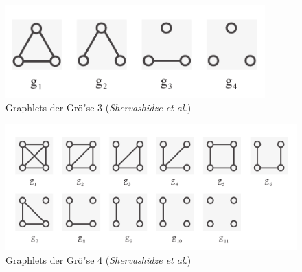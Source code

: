 \documentclass{report}
\begin{document}
\begin{center}


\begin{figure}[H]
\includegraphics[width =100mm]{3graphlets.pdf}
\caption{Graphlets der Gr\"o"se 3 (\textit{Shervashidze et al.})}
\label{fig:3graphlets}
\end{figure}


\begin{figure}[H]
\includegraphics[width =\linewidth]{4graphlets.pdf}
\caption{Graphlets der Gr\"o"se 4 (\textit{Shervashidze et al.})}
\label{fig:4graphlets}
\end{figure}

\end{center}
\end{document}

